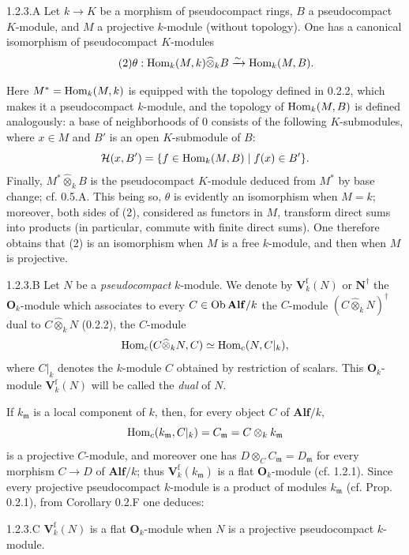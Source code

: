 \begin{lemma}{1.2.3.A}\label{VIIB.1.2.3.A}
Let $k\to K$ be a morphism of pseudocompact rings, $B$ a pseudocompact $K$-module, and $M$ a projective $k$-module (without topology). One has a canonical isomorphism of pseudocompact $K$-modules
\begin{equation}\tag{2}
\theta:\operatorname{Hom}_k(M,k)\widehat\otimes_k B\xrightarrow{\sim}\operatorname{Hom}_k(M,B).
\end{equation}
\end{lemma}
Here $M^*=\operatorname{Hom}_k(M,k)$ is equipped with the topology defined in 0.2.2, which makes it a pseudocompact $k$-module, and the topology of $\operatorname{Hom}_k(M,B)$ is defined analogously: a base of neighborhoods of $0$ consists of the following $K$-submodules, where $x\in M$ and $B'$ is an open $K$-submodule of $B$:
\[
\mathcal H(x,B')=\{f\in\operatorname{Hom}_k(M,B)\mid f(x)\in B'\}.
\]
Finally, $M^*\widehat\otimes_k B$ is the pseudocompact $K$-module deduced from $M^*$ by base change; cf. 0.5.A.
This being so, $\theta$ is evidently an isomorphism when $M=k$; moreover, both sides of (2), considered as functors in $M$, transform direct sums into products (in particular, commute with finite direct sums). One therefore obtains that (2) is an isomorphism when $M$ is a free $k$-module, and then when $M$ is projective.

\begin{definition}{1.2.3.B}\label{VIIB.1.2.3.B}
Let $N$ be a \emph{pseudocompact} $k$-module. We denote by $\mathbf V_k^{\mathrm f}(N)$ or $\mathbf N^\dagger$ the $\mathbf O_k$-module which associates to every $C\in\operatorname{Ob}\mathbf{Alf}/k$ the $C$-module $(C\widehat\otimes_k N)^\dagger$ dual to $C\widehat\otimes_k N$ (0.2.2), \ie the $C$-module
\[
\operatorname{Hom}_c(C\widehat\otimes_k N,C)\simeq\operatorname{Hom}_c(N,C|_k),
\]
where $C|_k$ denotes the $k$-module $C$ obtained by restriction of scalars. This $\mathbf O_k$-module $\mathbf V_k^{\mathrm f}(N)$ will be called the \emph{dual} of $N$.
\end{definition}
If $k_{\mathfrak m}$ is a local component of $k$, then, for every object $C$ of $\mathbf{Alf}/k$,
\[
\operatorname{Hom}_c(k_{\mathfrak m},C|_k)=C_{\mathfrak m}=C\otimes_k k_{\mathfrak m}
\]
is a projective $C$-module, and moreover one has $D\otimes_C C_{\mathfrak m}=D_{\mathfrak m}$ for every morphism $C\to D$ of $\mathbf{Alf}/k$; thus $\mathbf V_k^{\mathrm f}(k_{\mathfrak m})$ is a flat $\mathbf O_k$-module (cf. 1.2.1). Since every projective pseudocompact $k$-module is a product of modules $k_{\mathfrak m}$ (cf. Prop. 0.2.1), from Corollary 0.2.F one deduces:
\begin{corollary}{1.2.3.C}\label{VIIB.1.2.3.C}
$\mathbf V_k^{\mathrm f}(N)$ is a flat $\mathbf O_k$-module when $N$ is a projective pseudocompact $k$-module.
\end{corollary}

